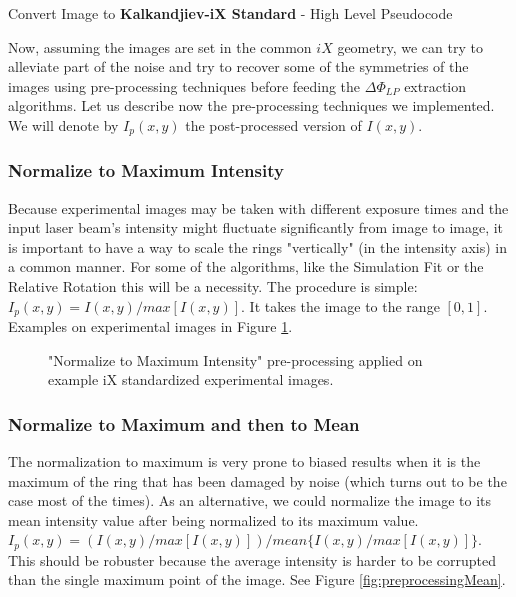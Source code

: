\documentclass[11pt, a4paper, twoside]{article} %
\begin{document}
\begin{algorithm}
\caption{ Convert Image to {\bf Kalkandjiev-iX Standard} - High Level Pseudocode }\label{alg:iX}
\end{algorithm}

Now, assuming the images are set in the common $iX$ geometry, we can try to alleviate part of the noise and try to recover some of the symmetries of the images using pre-processing techniques before feeding the $\Delta \Phi_{LP}$ extraction algorithms. Let us describe now the pre-processing techniques we implemented. We will denote by $I_p(x,y)$ the post-processed version of $I(x,y)$.\vspace{-0.3cm}

\subsubsection*{Normalize to Maximum Intensity}\vspace{-0.3cm}
Because experimental images may be taken with different exposure times and the input laser beam's intensity might fluctuate significantly from image to image, it is important to have a way to scale the rings "vertically" (in the intensity axis) in a common manner. For some of the algorithms, like the Simulation Fit or the Relative Rotation this will be a necessity. The procedure is simple: $I_p(x,y) = I(x,y)/max[I(x,y)]$. It takes the image to the range $[0,1]$. Examples on experimental images in Figure \ref{fig:preprocessingMax}.\vspace{-0.3cm}


\begin{figure}[h!] 
     \centering 
    \caption{"Normalize to Maximum Intensity" pre-processing applied on example iX standardized experimental images.}
    \label{fig:preprocessingMax}
\end{figure}

\subsubsection*{Normalize to Maximum and then to Mean}\vspace{-0.3cm}
The normalization to maximum is very prone to biased results when it is the maximum of the ring that has been damaged by noise (which turns out to be the case most of the times). As an alternative, we could normalize the image to its mean intensity value after being normalized to its maximum value. $I_p(x,y) = (I(x,y)/max[I(x,y)])/mean\{I(x,y)/max[I(x,y)]\}$. This should be robuster because the average intensity is harder to be corrupted than the single maximum point of the image. See Figure \ref{fig:preprocessingMean}.
\end{document}
